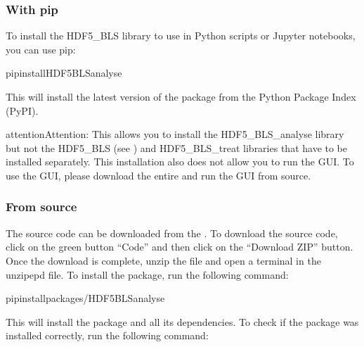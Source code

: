 \documentclass[letterpaper,10pt,english]{sphinxmanual}
\begin{document}
\subsubsection{With pip}
\label{\detokenize{source/hdf5_bls_analyse_package:with-pip}}
\sphinxAtStartPar
To install the HDF5\_BLS library to use in Python scripts or Jupyter notebooks, you can use pip:

\begin{sphinxVerbatim}[commandchars=\\\{\}]
pipinstallHDF5\PYGZus{}BLS\PYGZus{}analyse
\end{sphinxVerbatim}

\sphinxAtStartPar
This will install the latest version of the package from the Python Package Index (PyPI).

\begin{sphinxadmonition}{attention}{Attention:}
\sphinxAtStartPar
This allows you to install the HDF5\_BLS\_analyse library but not the HDF5\_BLS (see {\hyperref[\detokenize{source/hdf5_bls_package:hdf5-bls-package-installation}]{}}) and HDF5\_BLS\_treat libraries that have to be installed separately. This installation also does not allow you to run the GUI. To use the GUI, please download the entire  and run the GUI from source.
\end{sphinxadmonition}


\subsubsection{From source}
\label{\detokenize{source/hdf5_bls_analyse_package:from-source}}
\sphinxAtStartPar
The source code can be downloaded from the . To download the source code, click on the green button “Code” and then click on the “Download ZIP” button. Once the download is complete, unzip the file and open a terminal in the unzipepd file. To install the package, run the following command:

\begin{sphinxVerbatim}[commandchars=\\\{\}]
pipinstallpackages/HDF5\PYGZus{}BLS\PYGZus{}analyse
\end{sphinxVerbatim}

\sphinxAtStartPar
This will install the package and all its dependencies. To check if the package was installed correctly, run the following command:
\end{document}
